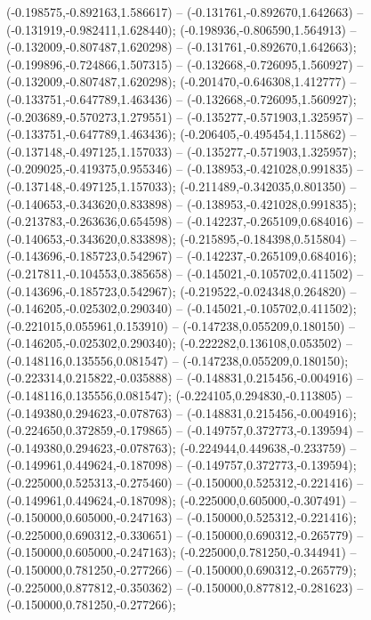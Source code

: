  (-0.198575,-0.892163,1.586617) -- (-0.131761,-0.892670,1.642663) -- (-0.131919,-0.982411,1.628440);
 (-0.198936,-0.806590,1.564913) -- (-0.132009,-0.807487,1.620298) -- (-0.131761,-0.892670,1.642663);
 (-0.199896,-0.724866,1.507315) -- (-0.132668,-0.726095,1.560927) -- (-0.132009,-0.807487,1.620298);
 (-0.201470,-0.646308,1.412777) -- (-0.133751,-0.647789,1.463436) -- (-0.132668,-0.726095,1.560927);
 (-0.203689,-0.570273,1.279551) -- (-0.135277,-0.571903,1.325957) -- (-0.133751,-0.647789,1.463436);
 (-0.206405,-0.495454,1.115862) -- (-0.137148,-0.497125,1.157033) -- (-0.135277,-0.571903,1.325957);
 (-0.209025,-0.419375,0.955346) -- (-0.138953,-0.421028,0.991835) -- (-0.137148,-0.497125,1.157033);
 (-0.211489,-0.342035,0.801350) -- (-0.140653,-0.343620,0.833898) -- (-0.138953,-0.421028,0.991835);
 (-0.213783,-0.263636,0.654598) -- (-0.142237,-0.265109,0.684016) -- (-0.140653,-0.343620,0.833898);
 (-0.215895,-0.184398,0.515804) -- (-0.143696,-0.185723,0.542967) -- (-0.142237,-0.265109,0.684016);
 (-0.217811,-0.104553,0.385658) -- (-0.145021,-0.105702,0.411502) -- (-0.143696,-0.185723,0.542967);
 (-0.219522,-0.024348,0.264820) -- (-0.146205,-0.025302,0.290340) -- (-0.145021,-0.105702,0.411502);
 (-0.221015,0.055961,0.153910) -- (-0.147238,0.055209,0.180150) -- (-0.146205,-0.025302,0.290340);
 (-0.222282,0.136108,0.053502) -- (-0.148116,0.135556,0.081547) -- (-0.147238,0.055209,0.180150);
 (-0.223314,0.215822,-0.035888) -- (-0.148831,0.215456,-0.004916) -- (-0.148116,0.135556,0.081547);
 (-0.224105,0.294830,-0.113805) -- (-0.149380,0.294623,-0.078763) -- (-0.148831,0.215456,-0.004916);
 (-0.224650,0.372859,-0.179865) -- (-0.149757,0.372773,-0.139594) -- (-0.149380,0.294623,-0.078763);
 (-0.224944,0.449638,-0.233759) -- (-0.149961,0.449624,-0.187098) -- (-0.149757,0.372773,-0.139594);
 (-0.225000,0.525313,-0.275460) -- (-0.150000,0.525312,-0.221416) -- (-0.149961,0.449624,-0.187098);
 (-0.225000,0.605000,-0.307491) -- (-0.150000,0.605000,-0.247163) -- (-0.150000,0.525312,-0.221416);
 (-0.225000,0.690312,-0.330651) -- (-0.150000,0.690312,-0.265779) -- (-0.150000,0.605000,-0.247163);
 (-0.225000,0.781250,-0.344941) -- (-0.150000,0.781250,-0.277266) -- (-0.150000,0.690312,-0.265779);
 (-0.225000,0.877812,-0.350362) -- (-0.150000,0.877812,-0.281623) -- (-0.150000,0.781250,-0.277266);
